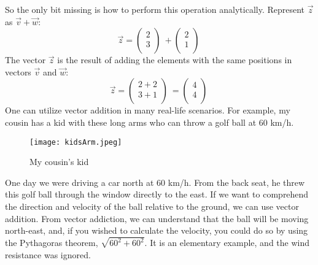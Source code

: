 \documentclass[a4,12pt,twosided,openany]{memoir}
\begin{document}
So the only bit missing is how to perform this operation analytically. Represent $\overrightarrow{z}$ as $\overrightarrow{v} + \overrightarrow{w}$: 
\[
\overrightarrow{z} = \begin{pmatrix}
 2\\
 3\\
\end{pmatrix}\ +
\begin{pmatrix}
 2\\
 1\\
\end{pmatrix}\
\]
The vector $\overrightarrow{z}$ is the result of adding the elements with the same positions in vectors $\overrightarrow{v}$ and $\overrightarrow{w}$:
\[
\overrightarrow{z} = \begin{pmatrix}
 2 + 2\\
 3 + 1\\
\end{pmatrix}\ 
= \begin{pmatrix}
4\\
4\\
\end{pmatrix}\ 
\]
One can utilize vector addition in many real-life scenarios. For example, my cousin has a kid with these long arms who can throw a golf ball at 60 km/h.
\begin{figure}[h!]
\texttt{[image: kidsArm.jpeg]}
\centering
\vspace*{15pt}
\caption{My cousin's kid}
\end{figure}
\par 
\indent
One day we were driving a car north at 60 km/h. From the back seat, he threw this golf ball through the window directly to the east. If we want to comprehend the direction and velocity of the ball relative to the ground, we can use vector addition. From vector addiction, we can understand that the ball will be moving north-east, and, if you wished to calculate the velocity, you could do so by using the Pythagoras theorem, $\sqrt{60^2 + 60^2}$. It is an elementary example, and the wind resistance was ignored.
\end{document}
